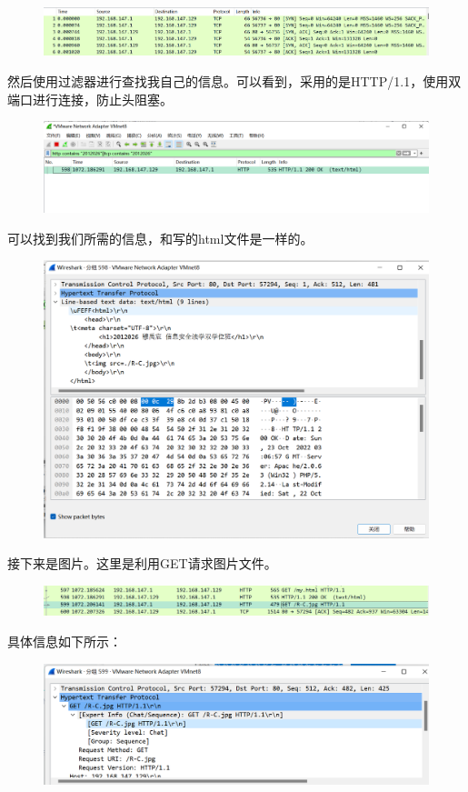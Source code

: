 \documentclass[UTF8,a4paper,10pt]{ctexart}
\begin{document}
\begin{figure}[H]
    \centering
    \includegraphics[scale=0.4]{12.png}
    \label{fig:12}
\end{figure}
然后使用过滤器进行查找我自己的信息。可以看到，采用的是HTTP/1.1，使用双端口进行连接，防止头阻塞。
\begin{figure}[H]
    \centering
    \includegraphics[scale=0.6]{13.png}
    \label{fig:13}
\end{figure}
可以找到我们所需的信息，和写的html文件是一样的。
\begin{figure}[H]
    \centering
    \includegraphics[scale=0.4]{142.png}
    \label{fig:14}
\end{figure}
接下来是图片。这里是利用GET请求图片文件。
\begin{figure}[H]
    \centering
    \includegraphics[scale=0.4]{15.png}
    \label{fig:15}
\end{figure}
具体信息如下所示：
\begin{figure}[H]
    \centering
    \includegraphics[scale=0.4]{16.png}
    \label{fig:16}
\end{figure}
\end{document}
